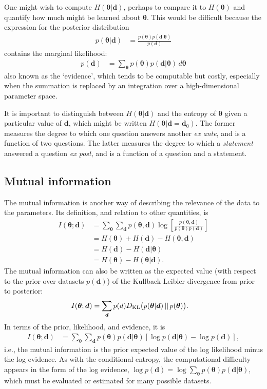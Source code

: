 \documentclass[entropy,article,accept,oneauthor,pdftex,10pt,a4paper]{mdpi}
\renewcommand{\d}{\boldsymbol{d}}
\newcommand{\x}{\boldsymbol{\theta}}
\begin{document}
One might wish to compute $H(\x | \d)$, perhaps to compare it to
$H(\x)$ and quantify how much might be learned about $\x$.
This would be difficult because the expression
for the posterior distribution
\begin{align}
p(\x | \d) &= \frac{p(\x)p(\d | \x)}{p(\d)}
\end{align}
contains the marginal likelihood:
\begin{align}
p(\d) &= \sum_{\x} p(\x) p(\d | \x) \, d\x
\end{align}
also known as the `evidence', which tends to be computable but costly,
especially when the summation is replaced by an integration over a
high-dimensional parameter space.

It is important to distinguish between $H(\x | \d)$ and the
entropy of $\x$ given a particular value of $\d$, which might be written
$H(\x | \d=\d_0)$.
The former measures the degree to which one question answers
another {\em ex ante}, and is a function of two questions.
The latter measures the degree to which a {\em statement} answered a question
{\em ex post}, and is a function of a question and a statement.

\subsection{Mutual information}

The mutual information is another way of describing the relevance of the
data to the parameters. Its definition, and relation to other quantities, is
\begin{align}
I(\x; \d) &= \sum_{\x} \sum_{\d} p(\x, \d)
                       \log\left[\frac{p(\x, \d)}{p(\x)p(\d)}\right]\\
           &= H(\x) + H(\d) - H(\x, \d)\\
           &= H(\d) - H(\d | \x)\\
           &= H(\x) - H(\x | \d).
\end{align}
The mutual information can also be written as the expected value
(with respect to the prior over datasets $p(\d)$) of the Kullback-Leibler
divergence from prior to posterior:
\begin{align}
I(\x ; \d) &= \sum_{\d} p(d) D_{\rm KL}\big(p(\x|\d) \, || \, p(\x)\big).
\end{align}
In terms of the prior, likelihood, and evidence,
it is
\begin{align}
I(\x; \d) &= \sum_{\x} \sum_{\d} p(\x)p(\d | \x)
              \left[\log p(\d | \x) - \log p(\d)\right],
\end{align}
i.e., the mutual information is the prior expected value of the
log likelihood minus the log evidence.
As with the conditional entropy, the computational
difficulty appears in the form of the log evidence,
$\log p(\d) = \log \sum_{\x} p(\x)p(\d | \x)$, which must be evaluated
or estimated for many possible datasets.
\end{document}
